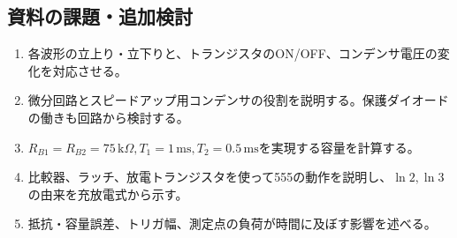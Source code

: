 \documentclass[lualatex,a4paper,10pt]{jlreq}
\begin{document}
\subsection{資料の課題・追加検討}
\begin{enumerate}
\item 各波形の立上り・立下りと、トランジスタのON/OFF、コンデンサ電圧の変化を対応させる。
\item 微分回路とスピードアップ用コンデンサの役割を説明する。保護ダイオードの働きも回路から検討する。
\item $R_{B1}=R_{B2}=75\,\mathrm{k}\Omega,T_1=1\,\mathrm{ms},T_2=0.5\,\mathrm{ms}$を実現する容量を計算する。
\item 比較器、ラッチ、放電トランジスタを使って555の動作を説明し、$\ln2,\ln3$の由来を充放電式から示す。
\item 抵抗・容量誤差、トリガ幅、測定点の負荷が時間に及ぼす影響を述べる。
\end{enumerate}
\end{document}
